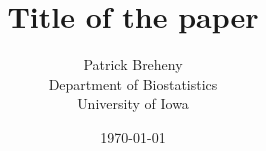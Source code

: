 \documentclass{article}
\title{Title of the paper}
\author{Patrick Breheny\\Department of Biostatistics\\University of Iowa}
\date{\today}
\begin{document}
\maketitle

\begin{abstract}
  
\end{abstract}





\end{document}
